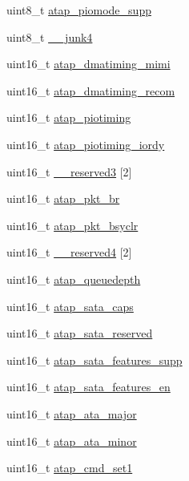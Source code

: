 \begin{DoxyCompactItemize}
\item 
uint8\_\-t \hyperlink{structataparams_a279fd18bfea282fe3c4d7beb6e0be4ef}{atap\_\-piomode\_\-supp}
\item 
uint8\_\-t \hyperlink{structataparams_a3cad51451a572fc89a1d4058ca46329e}{\_\-\_\-junk4}
\item 
uint16\_\-t \hyperlink{structataparams_a15c23ad3783b2c0356eb71a25f090dff}{atap\_\-dmatiming\_\-mimi}
\item 
uint16\_\-t \hyperlink{structataparams_a0392a70b8337e19c16f1e6e0b2c0cc8f}{atap\_\-dmatiming\_\-recom}
\item 
uint16\_\-t \hyperlink{structataparams_a10a025e80edd1bd058798dff3bedd346}{atap\_\-piotiming}
\item 
uint16\_\-t \hyperlink{structataparams_a132929b65071d57ba761744aaa41bfbe}{atap\_\-piotiming\_\-iordy}
\item 
uint16\_\-t \hyperlink{structataparams_affab34cd772b580f19597e34bdc2eddc}{\_\-\_\-reserved3} \mbox{[}2\mbox{]}
\item 
uint16\_\-t \hyperlink{structataparams_ac8d9e5af033138b1816e43d99f97a54e}{atap\_\-pkt\_\-br}
\item 
uint16\_\-t \hyperlink{structataparams_ae0f2a5046a4316b37a94937273b9424c}{atap\_\-pkt\_\-bsyclr}
\item 
uint16\_\-t \hyperlink{structataparams_a5d0b68a6fcc753d7ca207ccc1e782391}{\_\-\_\-reserved4} \mbox{[}2\mbox{]}
\item 
uint16\_\-t \hyperlink{structataparams_ad02f1a387fe92b9db42e06c192828e31}{atap\_\-queuedepth}
\item 
uint16\_\-t \hyperlink{structataparams_a47b0b929da7602f654da1c813ccac604}{atap\_\-sata\_\-caps}
\item 
uint16\_\-t \hyperlink{structataparams_af15662549df5c2da002e9ced7db81c49}{atap\_\-sata\_\-reserved}
\item 
uint16\_\-t \hyperlink{structataparams_a52d170c3a23765b4cdbdbde0e89350e0}{atap\_\-sata\_\-features\_\-supp}
\item 
uint16\_\-t \hyperlink{structataparams_a96594aab635764e0dee59ab8f802f906}{atap\_\-sata\_\-features\_\-en}
\item 
uint16\_\-t \hyperlink{structataparams_ae28c5731e91bd1eb31e5ac3fc993ff09}{atap\_\-ata\_\-major}
\item 
uint16\_\-t \hyperlink{structataparams_a93fe0aaf83692043cce5670d88ca3b77}{atap\_\-ata\_\-minor}
\item 
uint16\_\-t \hyperlink{structataparams_a9739abfd4bfb38c403686f177e49c695}{atap\_\-cmd\_\-set1}

\end{DoxyCompactItemize}
